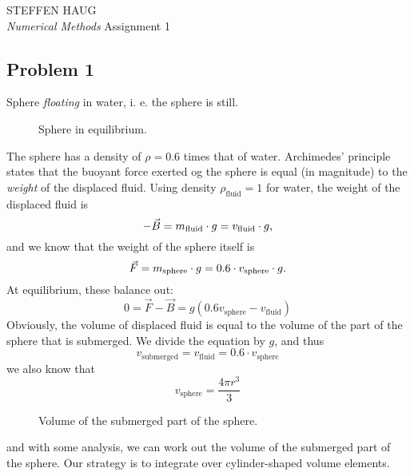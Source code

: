 \documentclass[12pt]{article}
\begin{document}
\begin{titlepage}
    \pagecolor{Themecolor}
    \afterpage{
        \nopagecolor
        \restoregeometry
    }
    \begin{center}
        {\large{}STEFFEN HAUG}\\[2em]
        {\Huge\it Numerical Methods}
        \vfill
        {\ttfamily Assignment 1}
    \end{center}
\end{titlepage}

\begin{multicols}{2}

\section*{Problem 1}
Sphere {\em floating} in water, i. e. the sphere is still.
\begin{figure}[H]
\centering

\caption{
    Sphere in equilibrium.
}
\end{figure}
\noindent
The sphere has a density of $\rho = 0.6$ times that of water.
Archimedes' principle states that the buoyant force exerted
og the sphere is equal (in magnitude) to the {\em weight} of the displaced fluid.
    Using density $\rho_\text{fluid} = 1$ for water, the weight of the displaced fluid is
\[
    -\vec{B} = m_{\text{fluid}} \cdot g = v_{\text{fluid}} \cdot g \text,
\]
and we know that the weight of the sphere itself is
\[
    \vec{F} = m_{\text{sphere}} \cdot g = 0.6 \cdot v_{\text{sphere}} \cdot g \text.
\]
At equilibrium, these balance out:
\[
    0 = \vec F - \vec B
        = g(0.6v_\text{sphere} - v_\text{fluid})
\]
Obviously, the volume of displaced fluid is equal to the volume of the
part of the sphere that is submerged.
We divide the equation by $g$, and thus
\begin{equation}
    v_\text{submerged} = v_\text{fluid} = 0.6 \cdot v_\text{sphere}
\end{equation}
we also know that
\begin{equation}
    v_\text{sphere} = \frac{4\pi r^3}{3}
\end{equation}
\begin{figure}[H]
\centering

\caption{
    Volume of the submerged part of the sphere.
}
\end{figure}
\noindent
and with some analysis, we can work out the volume of the submerged
part of the sphere. Our strategy is to integrate over
cylinder-shaped volume elements.


\end{multicols}
\end{document}
